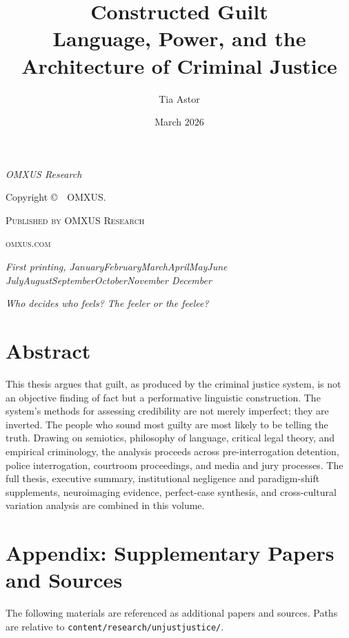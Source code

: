 \documentclass[11pt,a4paper,openright]{book}
\title{Constructed Guilt\\\large Language, Power, and the Architecture of Criminal Justice}
\date{March 2026}
\author{Tia Astor}
\makeatletter
\newcommand{\publisher}{OMXUS Research}
\newcommand{\monthyear}{%
  \ifcase\month\or January\or February\or March\or April\or May\or June\or
  July\or August\or September\or October\or November\or
  December\fi\space\number\year
}
\renewcommand{\maketitle}{%
  \begingroup
  \setlength{\parindent}{0pt}
  \fontsize{24}{24}\selectfont\textit{\@author}\par
  \vspace{1.75in}
  \fontsize{36}{54}\selectfont\@title\par
  \vspace{0.5in}
  \fontsize{14}{14}\selectfont\textsc{\@date}\par
  \vfill
  \fontsize{14}{14}\selectfont\textit{\publisher}\par
  \thispagestyle{empty}
  \newpage
  \endgroup
}
\makeatother
\begin{document}
\frontmatter

\maketitle

\newpage
\thispagestyle{empty}
\setlength{\parindent}{0pt}
\vfill
Copyright \copyright\ \the\year\ OMXUS.

\par\textsc{Published by OMXUS Research}

\par\textsc{omxus.com}

\par\textit{First printing, \monthyear}
\vfill

\tableofcontents

\cleardoublepage
\thispagestyle{empty}
\vfill
\noindent\fontsize{18}{22}\selectfont\itshape
Who decides who feels? The feeler or the feelee?
\vfill
\vfill

\cleardoublepage
\chapter*{Abstract}
This thesis argues that guilt, as produced by the criminal justice system, is not an objective finding of fact but a performative linguistic construction. The system's methods for assessing credibility are not merely imperfect; they are inverted. The people who sound most guilty are most likely to be telling the truth. Drawing on semiotics, philosophy of language, critical legal theory, and empirical criminology, the analysis proceeds across pre-interrogation detention, police interrogation, courtroom proceedings, and media and jury processes. The full thesis, executive summary, institutional negligence and paradigm-shift supplements, neuroimaging evidence, perfect-case synthesis, and cross-cultural variation analysis are combined in this volume.

\mainmatter


\backmatter
\chapter*{Appendix: Supplementary Papers and Sources}

The following materials are referenced as additional papers and sources. Paths are relative to \texttt{content/research/unjustjustice/}.
\end{document}
